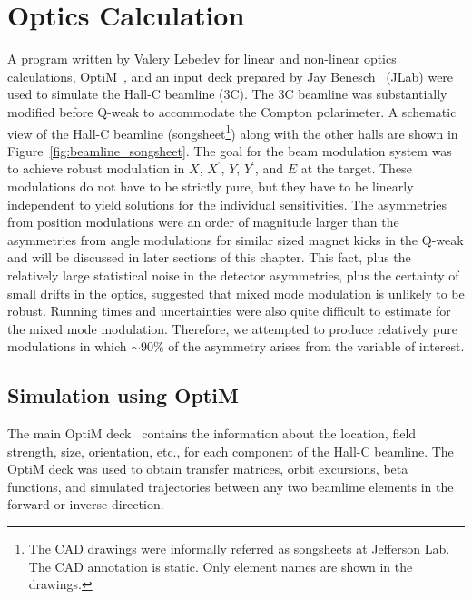 \section{Optics Calculation}
\label{Optics Calculation}
A program written by Valery Lebedev for linear and non-linear optics calculations, OptiM~\cite{OPTIM}, and an input deck prepared by Jay Benesch~\cite{jay_communication} (JLab) were used to simulate the Hall-C beamline (3C). The 3C beamline was substantially modified before Q-weak to accommodate the Compton polarimeter. A schematic view of the Hall-C beamline (songsheet\footnote{The CAD drawings were informally referred as songsheets at Jefferson Lab. The CAD annotation is static. Only element names are shown in the drawings.}) along with the other halls are shown in Figure~\ref{fig:beamline_songsheet}.
The goal for the beam modulation system was to achieve robust modulation in $X$, $X^{'}$, $Y$, $Y^{'}$, and $E$ at the target. These modulations do not have to be strictly pure, but they have to be linearly independent to yield solutions for the individual sensitivities. The asymmetries from position modulations were an order of magnitude larger than the asymmetries from angle modulations for similar sized magnet kicks in the Q-weak and will be discussed in later sections of this chapter.
This fact, plus the relatively large statistical noise in the detector asymmetries, plus the certainty of small drifts in the optics, suggested that mixed mode modulation is unlikely to be robust. Running times and uncertainties were also quite difficult to estimate for the mixed mode modulation. Therefore, we attempted to produce relatively pure modulations in which $\sim$90\% of the asymmetry arises from the variable of interest.

\subsection{Simulation using OptiM}
\label{Simulation using OptiM}
The main OptiM deck~\cite{optim_deck} contains the information about the location, field strength, size, orientation, etc., for each component of the Hall-C beamline.
The OptiM deck was used to obtain transfer matrices, orbit excursions, beta functions, and simulated trajectories between any two beamlime elements in the forward or inverse direction.

